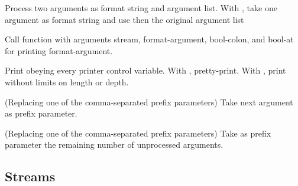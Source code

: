 \begin{LIST}{1cm}
\begin{LIST}{.5cm}
    {
    Process two arguments as format string and argument list. With
    , take one argument as format string and use then the
    original argument list
  }

    {
    Call function  with arguments stream, format-argument,
    bool-colon, and bool-at for printing format-argument.
  }

    {
    Print obeying every printer control variable. With \kwd{:},
    pretty-print. With , print without limits on length or depth.
  }

    {
    (Replacing one of the comma-separated prefix parameters) Take next
    argument as prefix parameter.
  }

    \IT{\KWD{\#}}
    {
    (Replacing one of the comma-separated prefix parameters) Take as
    prefix parameter the remaining number of unprocessed arguments.
  }

  \end{LIST}

\end{LIST}


\subsection{Streams} 

